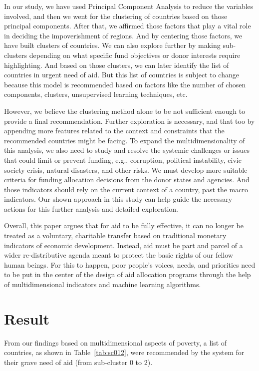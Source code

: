 \documentclass{swfuthesise}
\begin{document}
In our study, we have used Principal Component Analysis to reduce the variables involved, and then we went for the clustering of countries based on those principal components. After that, we affirmed those factors that play a vital role in deciding the impoverishment of regions. And by centering those factors, we have built clusters of countries. We can also explore further by making sub-clusters depending on what specific fund objectives or donor interests require highlighting. And based on those clusters, we can later identify the list of countries in urgent need of aid. But this list of countries is subject to change because this model is recommended based on factors like the number of chosen components, clusters, unsupervised learning techniques, etc.

However, we believe the clustering method alone to be not sufficient enough to provide a final recommendation. Further exploration is necessary, and that too by appending more features related to the context and constraints that the recommended countries might be facing. To expand the multidimensionality of this analysis, we also need to study and resolve the systemic challenges or issues that could limit or prevent funding, e.g., corruption, political instability, civic society crisis, natural disasters, and other risks. We must develop more suitable criteria for funding allocation decisions from the donor states and agencies. And those indicators should rely on the current context of a country, past the macro indicators. Our shown approach in this study can help guide the necessary actions for this further analysis and detailed exploration.

Overall, this paper argues that for aid to be fully effective, it can no longer be treated as a voluntary, charitable transfer based on traditional monetary indicators of economic development. Instead, aid must be part and parcel of a wider re-distributive agenda meant to protect the basic rights of our fellow human beings. For this to happen, poor people’s voices, needs, and priorities need to be put in the center of the design of aid allocation programs through the help of multidimensional indicators and machine learning algorithms.

\section{Result}
\label{sec:result}

From our findings based on multidimensional aspects of poverty, a list of countries, as shown in Table~\ref{tab:sc012}, were recommended by the system for their grave need of aid (from sub-cluster 0 to 2).
\end{document}
